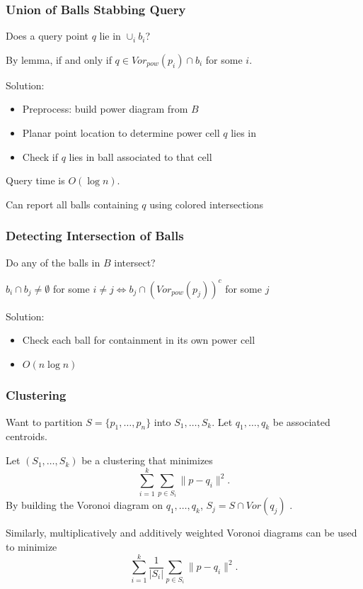 \documentclass{beamer}
\begin{document}
\begin{frame}
  \frametitle{Union of Balls Stabbing Query}

  Does a query point $q$ lie in $\cup_i b_i$?

  By lemma, if and only if $q \in Vor_{pow}(p_i) \cap b_i$ for some $i$.

  \vspace{.5cm}
  Solution:
  \begin{itemize}
    \item Preprocess: build power diagram from $B$
    \item Planar point location to determine power cell $q$ lies in
    \item Check if $q$ lies in ball associated to that cell
  \end{itemize}

  Query time is $O( \log n)$.

  Can report all balls containing $q$ using colored intersections \cite{ravi}

\end{frame}

\begin{frame}
  \frametitle{Detecting Intersection of Balls}

  Do any of the balls in $B$ intersect?

  \begin{lemma}
    $b_i \cap b_j \neq \emptyset$ for some $i \neq j \Leftrightarrow b_j \cap (Vor_{pow}(p_j))^c$ for some $j$
  \end{lemma}

  Solution:
  \begin{itemize}
    \item Check each ball for containment in its own power cell
    \item $O(n \log n)$
  \end{itemize}

\end{frame}

\begin{frame}
  \frametitle{Clustering}

  Want to partition $S = \{p_1,\ldots, p_n\}$ into $S_1, \ldots, S_k$. Let $q_1, \ldots, q_k$ be associated centroids.

  \begin{theorem}
    Let $(S_1, \ldots, S_k)$ be a clustering that minimizes
    \[ \sum_{i=1}^k \sum_{p \in S_i} \| p - q_i \|^2 .\]
    By building the Voronoi diagram on $q_1, \ldots, q_k$, $S_j = S \cap Vor(q_j)$ \cite{inaba_clustering}.
  \end{theorem}

  Similarly, multiplicatively and additively weighted Voronoi diagrams can be used to minimize
  \[ \sum_{i=1}^k \frac{1}{|S_i|} \sum_{p \in S_i} \| p - q_i \|^2 .\]

\end{frame}
\end{document}
